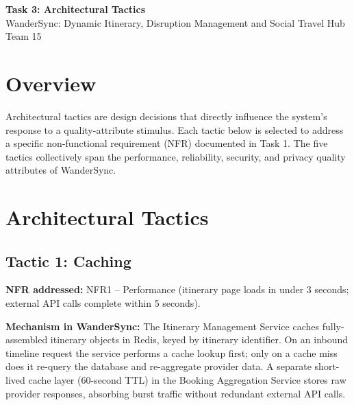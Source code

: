 \documentclass[12pt,a4paper]{article}
\begin{document}
\begin{center}
  {\LARGE\bfseries Task 3: Architectural Tactics}\\[0.4em]
  {\large WanderSync: Dynamic Itinerary, Disruption Management and Social Travel Hub}\\[0.2em]
  {\normalsize Team 15}
\end{center}

\vspace{1em}

\section{Overview}

Architectural tactics are design decisions that directly influence the system's response to a
quality-attribute stimulus. Each tactic below is selected to address a specific non-functional
requirement (NFR) documented in Task 1. The five tactics collectively span the performance,
reliability, security, and privacy quality attributes of WanderSync.

\section{Architectural Tactics}

\subsection{Tactic 1: Caching}

\textbf{NFR addressed:} NFR1 -- Performance (itinerary page loads in under 3 seconds; external
API calls complete within 5 seconds).

\textbf{Mechanism in WanderSync:}
The Itinerary Management Service caches fully-assembled itinerary objects in Redis, keyed by
itinerary identifier. On an inbound timeline request the service performs a cache lookup first;
only on a cache miss does it re-query the database and re-aggregate provider data. A separate
short-lived cache layer (60-second TTL) in the Booking Aggregation Service stores raw provider
responses, absorbing burst traffic without redundant external API calls.
\end{document}
